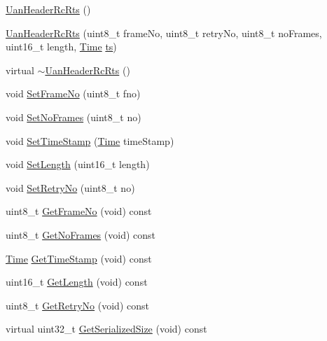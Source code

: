 \begin{DoxyCompactItemize}
\item 
\hyperlink{classns3_1_1UanHeaderRcRts_a1f923a59757af3aa35d7049229b8a745}{Uan\+Header\+Rc\+Rts} ()
\item 
\hyperlink{classns3_1_1UanHeaderRcRts_afbea396d757c1eeb94e367e939a77d99}{Uan\+Header\+Rc\+Rts} (uint8\+\_\+t frame\+No, uint8\+\_\+t retry\+No, uint8\+\_\+t no\+Frames, uint16\+\_\+t length, \hyperlink{classns3_1_1Time}{Time} \hyperlink{mmwave_2model_2fading-traces_2fading__trace__generator_8m_ada841f58d7be618bfbc76c87e7d44086}{ts})
\item 
virtual \hyperlink{classns3_1_1UanHeaderRcRts_a43ef181e6fa7c605a995216df755bd9f}{$\sim$\+Uan\+Header\+Rc\+Rts} ()
\item 
void \hyperlink{classns3_1_1UanHeaderRcRts_a3f46221d5f2b787266b640f2bfa2066c}{Set\+Frame\+No} (uint8\+\_\+t fno)
\item 
void \hyperlink{classns3_1_1UanHeaderRcRts_aef080414f27301779f3a98810e7a1d33}{Set\+No\+Frames} (uint8\+\_\+t no)
\item 
void \hyperlink{classns3_1_1UanHeaderRcRts_a4fd7ebe58baeb9a5b2fa55e3f511812c}{Set\+Time\+Stamp} (\hyperlink{classns3_1_1Time}{Time} time\+Stamp)
\item 
void \hyperlink{classns3_1_1UanHeaderRcRts_af4af5cf14a3c3878d9c4bb3d24a52ee9}{Set\+Length} (uint16\+\_\+t length)
\item 
void \hyperlink{classns3_1_1UanHeaderRcRts_acce912b3143899c8e34d114e09ca4601}{Set\+Retry\+No} (uint8\+\_\+t no)
\item 
uint8\+\_\+t \hyperlink{classns3_1_1UanHeaderRcRts_a374cbd095ad2d9e902d057ddd4486114}{Get\+Frame\+No} (void) const 
\item 
uint8\+\_\+t \hyperlink{classns3_1_1UanHeaderRcRts_a6a7d55330dd9ab915dcd190930ae3afd}{Get\+No\+Frames} (void) const 
\item 
\hyperlink{classns3_1_1Time}{Time} \hyperlink{classns3_1_1UanHeaderRcRts_a69e24cf38b5d56c5352aa7ff245721f9}{Get\+Time\+Stamp} (void) const 
\item 
uint16\+\_\+t \hyperlink{classns3_1_1UanHeaderRcRts_ae480c10b4a2d30d9986919fda7846430}{Get\+Length} (void) const 
\item 
uint8\+\_\+t \hyperlink{classns3_1_1UanHeaderRcRts_ab32ed37aa0efa02f2daeea1f0870f2b4}{Get\+Retry\+No} (void) const 
\item 
virtual uint32\+\_\+t \hyperlink{classns3_1_1UanHeaderRcRts_a7a26e0a8c69bd4d6330309c54b1d7db6}{Get\+Serialized\+Size} (void) const 

\end{DoxyCompactItemize}

